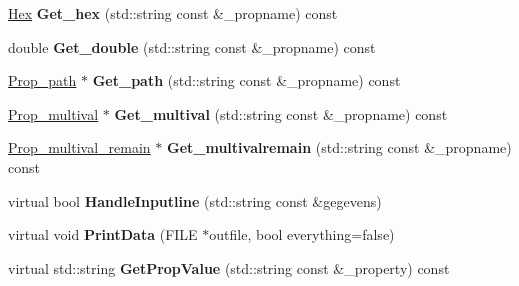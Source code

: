\begin{DoxyCompactItemize}
\item 
\hypertarget{classSection__prop_a27ea3faaa366883d57485239eca1fc48}{\hyperlink{classHex}{Hex} {\bfseries Get\-\_\-hex} (std\-::string const \&\-\_\-propname) const }\label{classSection__prop_a27ea3faaa366883d57485239eca1fc48}

\item 
\hypertarget{classSection__prop_ac7dd360e460d869bdcaa531693249a22}{double {\bfseries Get\-\_\-double} (std\-::string const \&\-\_\-propname) const }\label{classSection__prop_ac7dd360e460d869bdcaa531693249a22}

\item 
\hypertarget{classSection__prop_a8522e241de9dfcf71331b6f1dbc16841}{\hyperlink{classProp__path}{Prop\-\_\-path} $\ast$ {\bfseries Get\-\_\-path} (std\-::string const \&\-\_\-propname) const }\label{classSection__prop_a8522e241de9dfcf71331b6f1dbc16841}

\item 
\hypertarget{classSection__prop_a4471da0d01d645126b419f3698b2975c}{\hyperlink{classProp__multival}{Prop\-\_\-multival} $\ast$ {\bfseries Get\-\_\-multival} (std\-::string const \&\-\_\-propname) const }\label{classSection__prop_a4471da0d01d645126b419f3698b2975c}

\item 
\hypertarget{classSection__prop_abbb6160985f12a56526911ab1de6f8ed}{\hyperlink{classProp__multival__remain}{Prop\-\_\-multival\-\_\-remain} $\ast$ {\bfseries Get\-\_\-multivalremain} (std\-::string const \&\-\_\-propname) const }\label{classSection__prop_abbb6160985f12a56526911ab1de6f8ed}

\item 
\hypertarget{classSection__prop_aa18fa3fb45cdc41e54a15f1416a43914}{virtual bool {\bfseries Handle\-Inputline} (std\-::string const \&gegevens)}\label{classSection__prop_aa18fa3fb45cdc41e54a15f1416a43914}

\item 
\hypertarget{classSection__prop_aa49bc0d729b288d862e1db9cfc6e107c}{virtual void {\bfseries Print\-Data} (F\-I\-L\-E $\ast$outfile, bool everything=false)}\label{classSection__prop_aa49bc0d729b288d862e1db9cfc6e107c}

\item 
\hypertarget{classSection__prop_a6b6444bff385109361d271103aafdd4e}{virtual std\-::string {\bfseries Get\-Prop\-Value} (std\-::string const \&\-\_\-property) const }\label{classSection__prop_a6b6444bff385109361d271103aafdd4e}

\end{DoxyCompactItemize}
